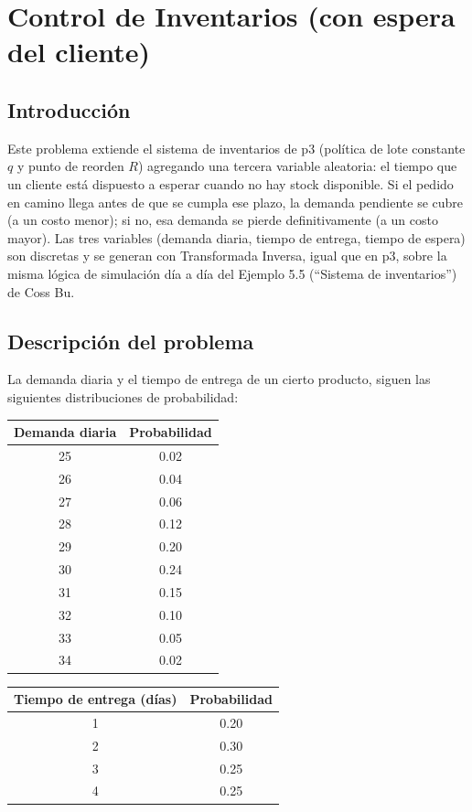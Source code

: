 \section{Control de Inventarios (con espera del cliente)}

\subsection{Introducción}

Este problema extiende el sistema de inventarios de p3 (política de lote constante $q$ y punto de reorden $R$) agregando una tercera variable aleatoria: el tiempo que un cliente está dispuesto a esperar cuando no hay stock disponible. Si el pedido en camino llega antes de que se cumpla ese plazo, la demanda pendiente se cubre (a un costo menor); si no, esa demanda se pierde definitivamente (a un costo mayor). Las tres variables (demanda diaria, tiempo de entrega, tiempo de espera) son discretas y se generan con Transformada Inversa, igual que en p3, sobre la misma lógica de simulación día a día del Ejemplo 5.5 (``Sistema de inventarios'') de Coss Bu.

\subsection{Descripción del problema}

La demanda diaria y el tiempo de entrega de un cierto producto, siguen las siguientes distribuciones de probabilidad:

\begin{center}
\begin{tabular}{cc}
\toprule
Demanda diaria & Probabilidad \\
\midrule
25 & 0.02 \\
26 & 0.04 \\
27 & 0.06 \\
28 & 0.12 \\
29 & 0.20 \\
30 & 0.24 \\
31 & 0.15 \\
32 & 0.10 \\
33 & 0.05 \\
34 & 0.02 \\
\bottomrule
\end{tabular}
\qquad
\begin{tabular}{cc}
\toprule
Tiempo de entrega (días) & Probabilidad \\
\midrule
1 & 0.20 \\
2 & 0.30 \\
3 & 0.25 \\
4 & 0.25 \\
\bottomrule
\end{tabular}
\end{center}

